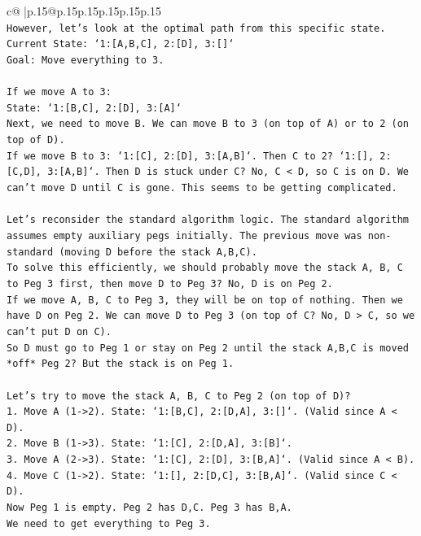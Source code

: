 \documentclass{article}
\begin{document}
{\begin{supertabular}{c@{$\;$}|p{.15\linewidth}@{}p{.15\linewidth}p{.15\linewidth}p{.15\linewidth}p{.15\linewidth}p{.15\linewidth}}
{{{\\ 
\texttt{However, let's look at the optimal path from this specific state.} \\
\texttt{Current State: `1:{[}A,B,C{]}, 2:{[}D{]}, 3:{[}{]}`} \\
\texttt{Goal: Move everything to 3.} \\
\\ 
\texttt{If we move A to 3:} \\
\texttt{State: `1:{[}B,C{]}, 2:{[}D{]}, 3:{[}A{]}`} \\
\texttt{Next, we need to move B. We can move B to 3 (on top of A) or to 2 (on top of D).} \\
\texttt{If we move B to 3: `1:{[}C{]}, 2:{[}D{]}, 3:{[}A,B{]}`. Then C to 2? `1:{[}{]}, 2:{[}C,D{]}, 3:{[}A,B{]}`. Then D is stuck under C? No, C < D, so C is on D. We can't move D until C is gone. This seems to be getting complicated.} \\
\\ 
\texttt{Let's reconsider the standard algorithm logic. The standard algorithm assumes empty auxiliary pegs initially. The previous move was non{-}standard (moving D before the stack A,B,C).} \\
\texttt{To solve this efficiently, we should probably move the stack A, B, C to Peg 3 first, then move D to Peg 3? No, D is on Peg 2.} \\
\texttt{If we move A, B, C to Peg 3, they will be on top of nothing. Then we have D on Peg 2. We can move D to Peg 3 (on top of C? No, D > C, so we can't put D on C).} \\
\texttt{So D must go to Peg 1 or stay on Peg 2 until the stack A,B,C is moved *off* Peg 2? But the stack is on Peg 1.} \\
\\ 
\texttt{Let's try to move the stack A, B, C to Peg 2 (on top of D)?} \\
\texttt{1. Move A (1{-}>2). State: `1:{[}B,C{]}, 2:{[}D,A{]}, 3:{[}{]}`. (Valid since A < D).} \\
\texttt{2. Move B (1{-}>3). State: `1:{[}C{]}, 2:{[}D,A{]}, 3:{[}B{]}`.} \\
\texttt{3. Move A (2{-}>3). State: `1:{[}C{]}, 2:{[}D{]}, 3:{[}B,A{]}`. (Valid since A < B).} \\
\texttt{4. Move C (1{-}>2). State: `1:{[}{]}, 2:{[}D,C{]}, 3:{[}B,A{]}`. (Valid since C < D).} \\
\texttt{Now Peg 1 is empty. Peg 2 has D,C. Peg 3 has B,A.} \\
\texttt{We need to get everything to Peg 3.} \\
}}}
\end{supertabular}}
\end{document}
